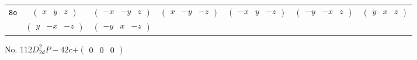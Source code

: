 \documentclass[fleqn,9pt,landscape]{jsarticle}
\begin{document}
\begin{center}
\begin{longtable}{ccccccc}
{\tt 8o} & $ \begin{pmatrix} x & y & z \end{pmatrix} $ & $ \begin{pmatrix} - x & - y & z \end{pmatrix} $ & $ \begin{pmatrix} x & - y & - z \end{pmatrix} $ & $ \begin{pmatrix} - x & y & - z \end{pmatrix} $ & $ \begin{pmatrix} - y & - x & z \end{pmatrix} $ & $ \begin{pmatrix} y & x & z \end{pmatrix} $ \\
& $ \begin{pmatrix} y & - x & - z \end{pmatrix} $ & $ \begin{pmatrix} - y & x & - z \end{pmatrix} $ & $  $ & $  $ & $  $ & $  $ \\
\end{longtable}
\end{center}
\newpage
No. 112\quad$D_{2d}^{2}$\quad$P-42c$\quad[ tetragonal ]\quad$+\begin{pmatrix} 0 & 0 & 0 \end{pmatrix}$
\end{document}
